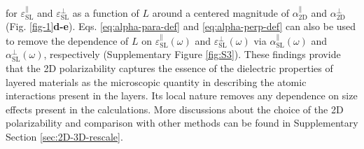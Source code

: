 \documentclass[journal=ancac3,manuscript=article,email=true,hyperref=true,keywords=false]{achemso}
\begin{document}
for $\varepsilon_{\mathrm{SL}}^{\parallel}$ and $\varepsilon_{\mathrm{SL}}^{\perp}$ as a function of $L$ around 
a centered magnitude of $\alpha_{\mathrm{2D}}^{\parallel}$ 
and $\alpha_{\mathrm{2D}}^{\perp}$ (Fig. \ref{fig-1}{\bf d-e}). 
Eqs. \ref{eq:alpha-para-def} and \ref{eq:alpha-perp-def} can also be used to remove 
the dependence of $L$ on $\varepsilon^{\parallel}_{\mathrm{SL}}(\omega)$ and
$\varepsilon^{\perp}_{\mathrm{SL}}(\omega)$ via $\alpha^{\parallel}_{\mathrm{SL}}(\omega)$ and
$\alpha^{\perp}_{\mathrm{SL}}(\omega)$, respectively (Supplementary Figure \ref{fig:S3}). 
%
% 
% 
% 
% 
These findings provide that the 2D polarizability captures the essence of the dielectric properties 
of layered materials as the microscopic quantity in describing the 
atomic interactions present in the layers. Its local nature removes any dependence on size effects 
present in the calculations.  
More discussions about the choice of the 2D polarizability
and comparison with other methods can be found in Supplementary Section \ref{sec:2D-3D-rescale}. 


\end{document}
